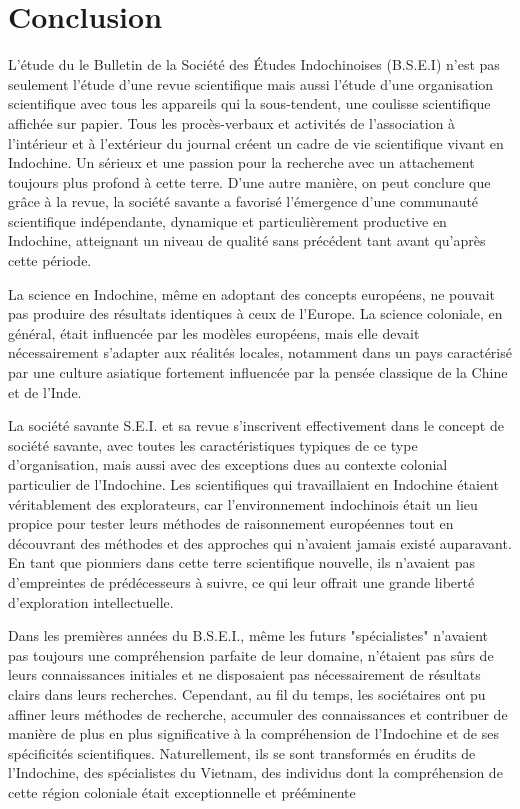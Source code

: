 \part*{Conclusion}

L'étude du le Bulletin de la Société des Études Indochinoises (B.S.E.I) n'est pas seulement l'étude d'une revue scientifique mais aussi l'étude d'une organisation scientifique avec tous les appareils qui la sous-tendent, une coulisse scientifique affichée sur papier. Tous les procès-verbaux et activités de l'association à l'intérieur et à l'extérieur du journal créent un cadre de vie scientifique vivant en Indochine. Un sérieux et une passion pour la recherche avec un attachement toujours plus profond à cette terre. D'une autre manière, on peut conclure que grâce à la revue, la société savante a favorisé l'émergence d'une communauté scientifique indépendante, dynamique et particulièrement productive en Indochine, atteignant un niveau de qualité sans précédent tant avant qu'après cette période.

La science en Indochine, même en adoptant des concepts européens, ne pouvait pas produire des résultats identiques à ceux de l'Europe. La science coloniale, en général, était influencée par les modèles européens, mais elle devait nécessairement s'adapter aux réalités locales, notamment dans un pays caractérisé par une culture asiatique fortement influencée par la pensée classique de la Chine et de l'Inde.

La société savante S.E.I. et sa revue s'inscrivent effectivement dans le concept de société savante, avec toutes les caractéristiques typiques de ce type d'organisation, mais aussi avec des exceptions dues au contexte colonial particulier de l'Indochine. Les scientifiques qui travaillaient en Indochine étaient véritablement des explorateurs, car l'environnement indochinois était un lieu propice pour tester leurs méthodes de raisonnement européennes tout en découvrant des méthodes et des approches qui n'avaient jamais existé auparavant. En tant que pionniers dans cette terre scientifique nouvelle, ils n'avaient pas d'empreintes de prédécesseurs à suivre, ce qui leur offrait une grande liberté d'exploration intellectuelle.

Dans les premières années du B.S.E.I., même les futurs "spécialistes" n'avaient pas toujours une compréhension parfaite de leur domaine, n'étaient pas sûrs de leurs connaissances initiales et ne disposaient pas nécessairement de résultats clairs dans leurs recherches. Cependant, au fil du temps, les sociétaires ont pu affiner leurs méthodes de recherche, accumuler des connaissances et contribuer de manière de plus en plus significative à la compréhension de l'Indochine et de ses spécificités scientifiques. Naturellement, ils se sont transformés en érudits de l'Indochine, des spécialistes du Vietnam, des individus dont la compréhension de cette région coloniale était exceptionnelle et prééminente

